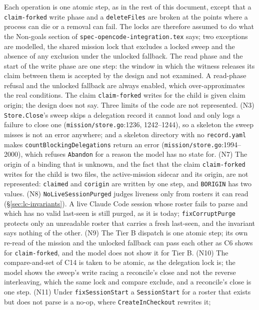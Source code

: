 \documentclass[a4paper,10pt,fleqn]{article}
\newcommand{\fpath}[1]{\texttt{#1}}
\newcommand{\field}[1]{\texttt{#1}}
\begin{document}
Each operation is one atomic step, as in the rest of this document, except
that a \field{claim-forked} write phase and a \field{deleteFiles} are
broken at the points where a process can die or a removal can fail. The
locks are therefore assumed to do what the Non-goals section of \texttt{spec-opencode-integration.tex} says; two
exceptions are modelled, the shared mission lock that excludes a locked
sweep and the absence of any exclusion under the unlocked fallback. The
read phase and the start of the write phase are one step: the window in
which the witness releases its claim between them is accepted by the
design and not examined. A read-phase refusal and the unlocked fallback
are always enabled, which over-approximates the real conditions. The claim
\field{claim-forked} writes for the child is given claim origin; the design
does not say. Three limits of the code are not represented. (N3) \field{Store.Close}'s
sweep skips a delegation record it cannot load and only logs a failure to
close one (\fpath{mission/store.go}:1236, 1242--1244), so a skeleton the
sweep misses is not an error anywhere; and a skeleton directory with no
\fpath{record.yaml} makes \field{countBlockingDelegations} return an error
(\fpath{mission/store.go}:1994--2000), which refuses \field{Abandon} for a
reason the model has no state for. (N7) The origin of a binding that is
unknown, and the fact that the claim \field{claim-forked} writes for the
child is two files, the active-mission sidecar and its origin, are not
represented: \field{claimed} and \field{corigin} are written by one step, and
\field{BORIGIN} has two values. (N8) \field{NoLiveSessionPurged} judges
liveness only from rosters it can read (\S\ref{sec:lc-invariants}). A live
Claude Code session whose roster fails to parse and which has no valid
last-seen is still purged, as it is today; \field{fixCorruptPurge} protects
only an unreadable roster that carries a fresh last-seen, and the invariant
says nothing of the other. (N9) The Tier B dispatch is one atomic
step; its own re-read of the mission and the unlocked fallback can pass each
other as C6 shows for \field{claim-forked}, and the model does not show it
for Tier B. (N10) The compare-and-set of C14 is taken to be atomic, as the
delegation lock is; the model shows the sweep's write racing a reconcile's
close and not the reverse interleaving, which the same lock and compare
exclude, and a reconcile's close is one step. (N11) Under
\field{fixSessionStart} a \field{SessionStart} for a roster that exists
but does not parse is a no-op, where \field{CreateInCheckout} rewrites it;
\end{document}
